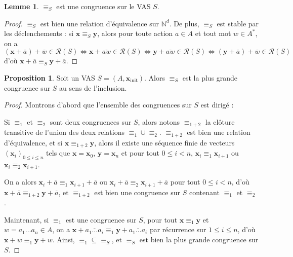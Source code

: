 \documentclass[a4paper,final]{article}
\theoremstyle{definition}
\newtheorem{Proposition}[Theorem]{Proposition}
\newtheorem{Lemma}[Theorem]{Lemme}
\let\leq\leqslant
\let\union\cup
\newcommand{\N}{\ensuremath{\mathbb{N}}}
\newcommand{\conf}{\ensuremath{\mathcal{R}}}
\newcommand{\vect}[1]{\ensuremath{\mathbf{#1}}}
\newcommand{\rel}{\ensuremath{\equiv}}
\newcommand{\equivaut}{\ensuremath{\Leftrightarrow}}
\newcommand{\xinit}{\ensuremath{\vect{x}_\text{init}}}
\newcommand{\valeur}[1]{\ensuremath{\overline{#1}}}
\begin{document}


\begin{Lemma}
 $\rel_S$ est une congruence sur le VAS $S$.
\end{Lemma}

\begin{proof}
$\rel_S$ est bien une relation d'équivalence sur $\N^d$.
De plus, $\rel_S$ est stable par les déclenchements : 
si $\vect{x}\rel_S \vect{y}$, alors pour toute action $a\in A$ et tout mot $w\in A^\ast$, 
on a $$(\vect{x} +\valeur{a}) +\valeur{w} \in\conf(S) 
    \equivaut \vect{x} +\valeur{aw} \in\conf(S)
    \equivaut \vect{y} +\valeur{aw} \in\conf(S)
    \equivaut (\vect{y} +\valeur{a}) +\valeur{w} \in\conf(S)$$
d'où $\vect{x}+\valeur{a} \rel_S \vect{y}+\valeur{a}$.
\end{proof}

\begin{Proposition}
Soit un VAS $S=(A,\xinit)$.
Alors $\rel_S$ est la plus grande congruence sur $S$ au sens de l'inclusion.
\end{Proposition}

\begin{proof}
Montrons d'abord que l'ensemble des congruences sur $S$ est dirigé :

Si $\rel_1$ et $\rel_2$ sont deux congruences sur $S$, alors notons $\rel_{1+2}$ la clôture transitive de l'union des deux relations $\rel_1\union\rel_2$.
$\rel_{1+2}$ est bien une relation d'équivalence, 
et si $\vect{x}\rel_{1+2}\vect{y}$, alors il existe une séquence finie de vecteurs ${(\vect{x}_i)}_{0\leq i\leq n}$ tels que 
$\vect{x}=\vect{x}_0$, $\vect{y}=\vect{x}_n$ et pour tout $0\leq i<n$, $\vect{x}_i\rel_1\vect{x}_{i+1}$ ou $\vect{x}_i\rel_2\vect{x}_{i+1}$.

On a alors $\vect{x}_i +\valeur{a} \rel_1 \vect{x}_{i+1} +\valeur{a}$ ou $\vect{x}_i +\valeur{a} \rel_2 \vect{x}_{i+1} +\valeur{a}$ pour tout $0\leq i<n$, 
d'où $\vect{x} +\valeur{a} \rel_{1+2} \vect{y} +\valeur{a}$, 
et $\rel_{1+2}$ est bien une congruence sur $S$ contenant $\rel_1$ et $\rel_2$.

Maintenant, si $\rel_1$ est une congruence sur $S$, pour tout $\vect{x}\rel_1\vect{y}$ et $w=a_1\dots a_n\in A$, on a 
$\vect{x} +\valeur{a_1\dots a_i} \rel_1\vect{y} +\valeur{a_1\dots a_i}$ par récurrence sur $1\leq i\leq n$, d'où $\vect{x} +\valeur{w} \rel_1\vect{y} +\valeur{w}$.
Ainsi, $\rel_1\subseteq \rel_S$, et $\rel_S$ est bien la plus grande congruence sur $S$.
\end{proof}
\end{document}
